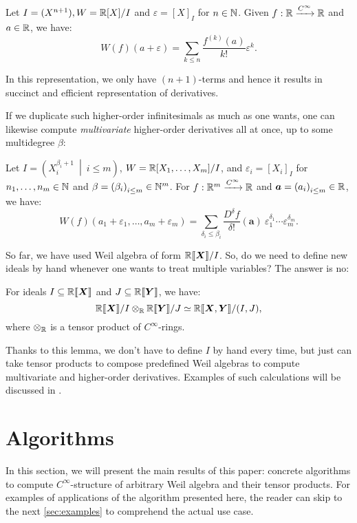 \documentclass[%
  sigconf,authorversion,screen]{acmart}
\begin{document}
\begin{lemma}\label{lem:higher-infinitesimal}
  Let $I = (X^{n + 1}), W = \mathbb{R}[X]/I$ and $\varepsilon = {[X]}_I$ for $n \in \mathbb{N}$.
  Given $f: \mathbb{R} \xrightarrow{C^\infty} \mathbb{R}$ and $a \in \mathbb{R}$, we have:
  \[
    W(f)(a + \varepsilon)
    = \sum_{k \leq n} \frac{f^{(k)}(a)}{k !} \varepsilon^k.
  \]
\end{lemma}
In this representation, we only have $(n + 1)$-terms and hence it results in succinct and efficient representation of derivatives.

If we duplicate such higher-order infinitesimals as much as one wants, one can likewise compute \emph{multivariate} higher-order derivatives all at once, up to some multidegree $\beta$:
\begin{lemma}
  Let $I = \left(X_i^{\beta_i + 1}\ \middle|\ i \leq m \right)$, $W = \mathbb{R}[X_1, \dots, X_m]/I$, and $\varepsilon_i = {[X_i]}_I$ for $n_1, \dots, n_m \in \mathbb{N}$ and $\beta = {(\beta_i)}_{i \leq m} \in \mathbb{N}^m$.
  For $f: \mathbb{R}^m \xrightarrow{C^\infty} \mathbb{R}$ and $\boldsymbol{a} = {(a_i)}_{i \leq m} \in \mathbb{R}$, we have:
  \[
    W(f)(a_1 + \varepsilon_1, \dots, a_m + \varepsilon_m) =
      \sum_{\delta_i \leq \beta_i} 
      \frac{D^\delta f}{\delta !}(\boldsymbol{a})\ \varepsilon_1^{\delta_1} \cdots \varepsilon_m^{\delta_m}.
  \]
\end{lemma}

So far, we have used Weil algebra of form $\mathord{\mathbb{R}\llbracket\boldsymbol{X}\rrbracket}/I$.
So, do we need to define new ideals by hand whenever one wants to treat multiple variables?
The answer is no:

\begin{lemma}
  \label{thm:quot-tensor}
  For ideals $I \subseteq \mathbb{R}\llbracket\boldsymbol{X}\rrbracket$ and $J \subseteq \mathbb{R}\llbracket{}\boldsymbol{Y}\rrbracket$, we have:
  \[
    \mathord{\mathbb{R}\llbracket\boldsymbol{X}\rrbracket}/I \otimes_{\mathbb{R}} \mathbb{R}\llbracket{}\boldsymbol{Y}\rrbracket/J \simeq
    \mathbb{R}\llbracket{}\boldsymbol{X}, \boldsymbol{Y}\rrbracket/(I, J),
  \]
  where $\otimes_{\mathbb{R}}$ is a tensor product of $C^\infty$-rings.
\end{lemma}
Thanks to this lemma, we don't have to define $I$ by hand every time, but just can take tensor products to compose predefined Weil algebras to compute multivariate and higher-order derivatives.
Examples of such calculations will be discussed in .

\section{Algorithms}\label{sec:alg}
In this section, we will present the main results of this paper: concrete algorithms to compute $C^\infty$-structure of arbitrary Weil algebra and their tensor products.
For examples of applications of the algorithm presented here, the reader can skip to the next \cref{sec:examples} to comprehend the actual use case.
\end{document}
